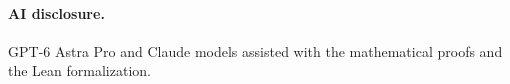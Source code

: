 \documentclass[11pt]{article}
\theoremstyle{definition}
\theoremstyle{remark}
\numberwithin{equation}{section}
\begin{document}






\paragraph{AI disclosure.}
GPT-6 Astra Pro and Claude models assisted with the mathematical proofs
and the Lean formalization.

\label{page:main-end}
\clearpage


\clearpage
\appendix
\renewcommand{\baselinestretch}{1}\small








\end{document}
